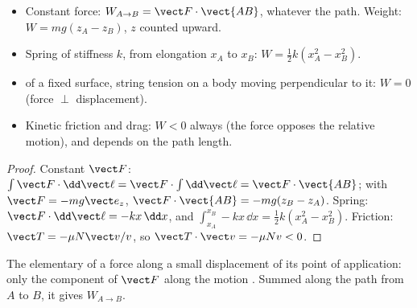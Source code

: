 \begin{proposition}\label{prop:b1:work-and-energy:works}
\begin{itemize}
  \item Constant force: $W_{A\to B} = \vect F\cdot\vect{AB}$, whatever the
        path. Weight: $W = mg(z_A - z_B)$, $z$ counted upward.
  \item Spring of stiffness $k$, from elongation $x_A$ to $x_B$:
        $W = \tfrac12 k(x_A^2 - x_B^2)$.
  \item {} of a fixed surface, string tension on a body
        moving perpendicular to it: $W = 0$ (force $\perp$ displacement).
  \item Kinetic friction and drag: $W < 0$ always (the force opposes the
        relative motion), and depends on the path length.
\end{itemize}
\end{proposition}

\begin{proof}
Constant $\vect F$: $\int\vect F\cdot\dd\vect\ell = \vect F\cdot\int\dd\vect\ell
= \vect F\cdot\vect{AB}$; with $\vect F = -mg\vect e_z$, $\vect F\cdot\vect{AB}
= -mg(z_B - z_A)$. Spring: $\vect F\cdot\dd\vect\ell = -kx\,\dd x$, and
$\int_{x_A}^{x_B}-kx\,\dd x = \tfrac12 k(x_A^2 - x_B^2)$. Friction: $\vect T
= -\mu N\vect v/v$, so $\vect T\cdot\vect v = -\mu Nv < 0$.
\end{proof}

\begin{omfigure}

{\small The elementary  of a force along a small displacement of
its point of application: only the component of $\vect F$ along the
motion . Summed along the path from $A$ to $B$, it gives
$W_{A\to B}$.}
\end{omfigure}

